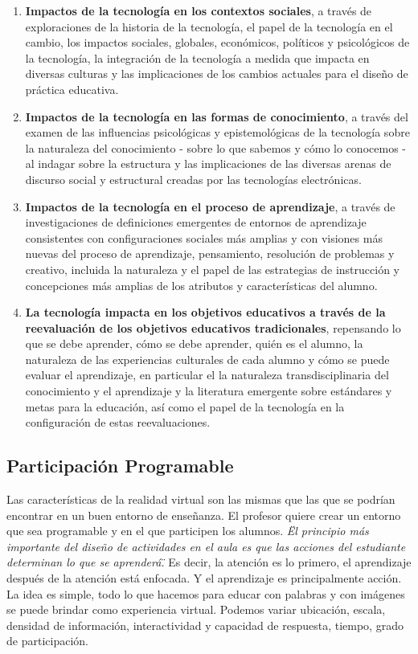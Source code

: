 \begin{enumerate}
	\item \textbf{Impactos de la tecnología en los contextos sociales}, a través de exploraciones de la historia de la tecnología, el papel de la tecnología en el cambio, los impactos sociales, globales, económicos, políticos y psicológicos de la tecnología, la integración de la tecnología a medida que impacta en diversas culturas y las implicaciones de los cambios actuales para el diseño de práctica educativa.
	\item \textbf{Impactos de la tecnología en las formas de conocimiento}, a través del examen de las influencias psicológicas y epistemológicas de la tecnología sobre la naturaleza del conocimiento - sobre lo que sabemos y cómo lo conocemos - al indagar sobre la estructura y las implicaciones de las diversas arenas de discurso social y estructural creadas por las tecnologías electrónicas.
	\item \textbf{Impactos de la tecnología en el proceso de aprendizaje}, a través de investigaciones de definiciones emergentes de entornos de aprendizaje consistentes con configuraciones sociales más amplias y con visiones más nuevas del proceso de aprendizaje, pensamiento, resolución de problemas y creativo, incluida la naturaleza y el papel de las estrategias de instrucción y concepciones más amplias de los atributos y características del alumno.
	\item \textbf{La tecnología impacta en los objetivos educativos a través de la reevaluación de los objetivos educativos tradicionales}, repensando lo que se debe aprender, cómo se debe aprender, quién es el alumno, la naturaleza de las experiencias culturales de cada alumno y cómo se puede evaluar el aprendizaje, en particular el la naturaleza transdisciplinaria del conocimiento y el aprendizaje y la literatura emergente sobre estándares y metas para la educación, así como el papel de la tecnología en la configuración de estas reevaluaciones.
\end{enumerate}

\subsection{Participación Programable}
Las características de la realidad virtual son las mismas que las que se podrían encontrar en un buen entorno de enseñanza. El profesor quiere crear un entorno que sea programable y en el que 
participen los alumnos. \textit{\"El principio más importante del diseño de actividades en el aula es que las acciones del estudiante determinan lo que se aprenderá\".} 
Es decir, la atención es lo primero, el aprendizaje después de la atención está enfocada. Y el aprendizaje es principalmente acción.\\ 
La idea es simple, todo lo que hacemos para educar con palabras y con imágenes se puede brindar como experiencia virtual. Podemos variar ubicación, escala, densidad de información, 
interactividad y capacidad de respuesta, tiempo, grado de participación.\\

